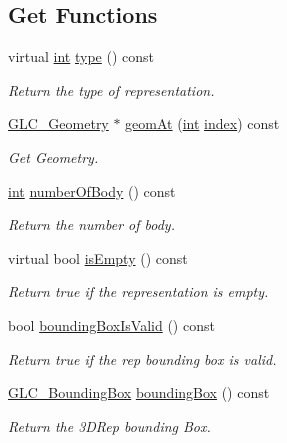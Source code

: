\subsection*{Get Functions}
\begin{DoxyCompactItemize}
\item 
virtual \hyperlink{ioapi_8h_a787fa3cf048117ba7123753c1e74fcd6}{int} \hyperlink{class_g_l_c__3_d_rep_a150ee489cfa8e446e0e7524123643ec4}{type} () const 
\begin{DoxyCompactList}\small\item\em Return the type of representation. \end{DoxyCompactList}\item 
\hyperlink{class_g_l_c___geometry}{G\-L\-C\-\_\-\-Geometry} $\ast$ \hyperlink{class_g_l_c__3_d_rep_afc721468e5a877015c4dca0f22cfb73b}{geom\-At} (\hyperlink{ioapi_8h_a787fa3cf048117ba7123753c1e74fcd6}{int} \hyperlink{glext_8h_ab47dd9958bcadea08866b42bf358e95e}{index}) const 
\begin{DoxyCompactList}\small\item\em Get Geometry. \end{DoxyCompactList}\item 
\hyperlink{ioapi_8h_a787fa3cf048117ba7123753c1e74fcd6}{int} \hyperlink{class_g_l_c__3_d_rep_a7a70d55b137b7bcc6099b1916bce6dfd}{number\-Of\-Body} () const 
\begin{DoxyCompactList}\small\item\em Return the number of body. \end{DoxyCompactList}\item 
virtual bool \hyperlink{class_g_l_c__3_d_rep_aa3bffd4cab1357a083dd290b26ac3504}{is\-Empty} () const 
\begin{DoxyCompactList}\small\item\em Return true if the representation is empty. \end{DoxyCompactList}\item 
bool \hyperlink{class_g_l_c__3_d_rep_aac57e2b8b3b316ff5ff100069c54aca1}{bounding\-Box\-Is\-Valid} () const 
\begin{DoxyCompactList}\small\item\em Return true if the rep bounding box is valid. \end{DoxyCompactList}\item 
\hyperlink{class_g_l_c___bounding_box}{G\-L\-C\-\_\-\-Bounding\-Box} \hyperlink{class_g_l_c__3_d_rep_ac47a8d9a7cc3458d90579b2ea1c0f3ab}{bounding\-Box} () const 
\begin{DoxyCompactList}\small\item\em Return the 3\-D\-Rep bounding Box. \end{DoxyCompactList}\item 

\end{DoxyCompactItemize}
